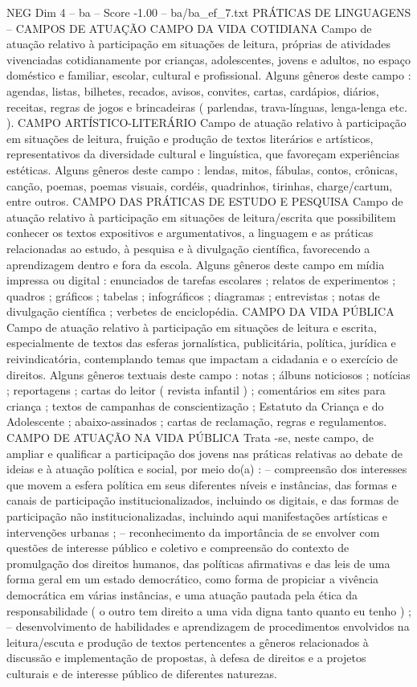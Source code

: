 \begin{textsample}{NEG Dim 4 – ba – Score -1.00 – ba/ba\_ef\_7.txt}  \label{ex:f4_neg_265}
PRÁTICAS DE LINGUAGENS – CAMPOS DE ATUAÇÃO CAMPO DA VIDA COTIDIANA Campo de atuação relativo à participação em situações de leitura, próprias de atividades vivenciadas cotidianamente por crianças, adolescentes, jovens e adultos, no espaço doméstico e familiar, escolar, cultural e profissional.
Alguns gêneros deste campo : agendas, listas, bilhetes, recados, avisos, convites, cartas, cardápios, diários, receitas, regras de jogos e brincadeiras ( parlendas, trava-línguas, lenga-lenga etc. ).
CAMPO ARTÍSTICO-LITERÁRIO Campo de atuação relativo à participação em situações de leitura, fruição e produção de textos literários e artísticos, representativos da diversidade cultural e linguística, que favoreçam experiências estéticas.
Alguns gêneros deste campo : lendas, mitos, fábulas, contos, crônicas, canção, poemas, poemas visuais, cordéis, quadrinhos, tirinhas, charge/cartum, entre outros.
CAMPO DAS PRÁTICAS DE ESTUDO E PESQUISA Campo de atuação relativo à participação em situações de leitura/escrita que possibilitem conhecer os textos expositivos e argumentativos, a linguagem e as práticas relacionadas ao estudo, à pesquisa e à divulgação científica, favorecendo a aprendizagem dentro e fora da escola.
Alguns gêneros deste campo em mídia impressa ou digital : enunciados de tarefas escolares ; relatos de experimentos ; quadros ; gráficos ; tabelas ; infográficos ; diagramas ; entrevistas ; notas de divulgação científica ; verbetes de enciclopédia.
CAMPO DA VIDA PÚBLICA Campo de atuação relativo à participação em situações de leitura e escrita, especialmente de textos das esferas jornalística, publicitária, política, jurídica e reivindicatória, contemplando temas que impactam a cidadania e o exercício de direitos.
Alguns gêneros textuais deste campo : notas ; álbuns noticiosos ; notícias ; reportagens ; cartas do leitor ( revista infantil ) ; comentários em sites para criança ; textos de campanhas de conscientização ; Estatuto da Criança e do Adolescente ; abaixo-assinados ; cartas de reclamação, regras e regulamentos.
CAMPO DE ATUAÇÃO NA VIDA PÚBLICA Trata -se, neste campo, de ampliar e qualificar a participação dos jovens nas práticas relativas ao debate de ideias e à atuação política e social, por meio do(a) : – compreensão dos interesses que movem a esfera política em seus diferentes níveis e instâncias, das formas e canais de participação institucionalizados, incluindo os digitais, e das formas de participação não institucionalizadas, incluindo aqui manifestações artísticas e intervenções urbanas ; – reconhecimento da importância de se envolver com questões de interesse público e coletivo e compreensão do contexto de promulgação dos direitos humanos, das políticas afirmativas e das leis de uma forma geral em um estado democrático, como forma de propiciar a vivência democrática em várias instâncias, e uma atuação pautada pela ética da responsabilidade ( o outro tem direito a uma vida digna tanto quanto eu tenho ) ; – desenvolvimento de habilidades e aprendizagem de procedimentos envolvidos na leitura/escuta e produção de textos pertencentes a gêneros relacionados à discussão e implementação de propostas, à defesa de direitos e a projetos culturais e de interesse público de diferentes naturezas.

\end{textsample}
